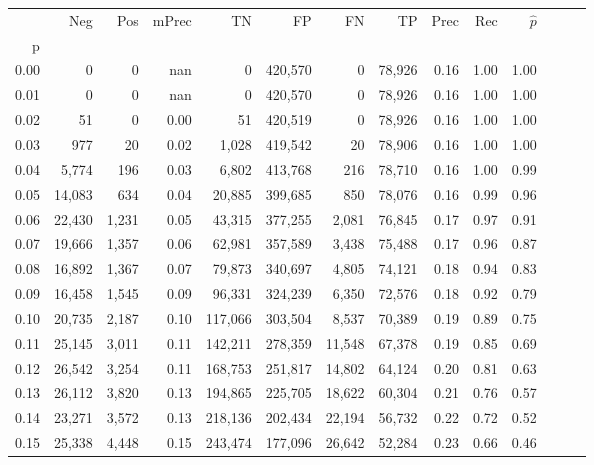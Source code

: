 \begin{tabular}{rrrrrrrrrrrrrr}
\toprule
{} &     Neg &    Pos & mPrec &       TN &       FP &      FN &      TP &  Prec &   Rec & $\hat{p}$ \\
p    &         &        &       &          &          &         &         &       &       &           \\
\midrule
0.00 &       0 &      0 &   nan &        0 &  420,570 &       0 &  78,926 &  0.16 &  1.00 &      1.00 \\
0.01 &       0 &      0 &   nan &        0 &  420,570 &       0 &  78,926 &  0.16 &  1.00 &      1.00 \\
0.02 &      51 &      0 &  0.00 &       51 &  420,519 &       0 &  78,926 &  0.16 &  1.00 &      1.00 \\
0.03 &     977 &     20 &  0.02 &    1,028 &  419,542 &      20 &  78,906 &  0.16 &  1.00 &      1.00 \\
0.04 &   5,774 &    196 &  0.03 &    6,802 &  413,768 &     216 &  78,710 &  0.16 &  1.00 &      0.99 \\
0.05 &  14,083 &    634 &  0.04 &   20,885 &  399,685 &     850 &  78,076 &  0.16 &  0.99 &      0.96 \\
0.06 &  22,430 &  1,231 &  0.05 &   43,315 &  377,255 &   2,081 &  76,845 &  0.17 &  0.97 &      0.91 \\
0.07 &  19,666 &  1,357 &  0.06 &   62,981 &  357,589 &   3,438 &  75,488 &  0.17 &  0.96 &      0.87 \\
0.08 &  16,892 &  1,367 &  0.07 &   79,873 &  340,697 &   4,805 &  74,121 &  0.18 &  0.94 &      0.83 \\
0.09 &  16,458 &  1,545 &  0.09 &   96,331 &  324,239 &   6,350 &  72,576 &  0.18 &  0.92 &      0.79 \\
0.10 &  20,735 &  2,187 &  0.10 &  117,066 &  303,504 &   8,537 &  70,389 &  0.19 &  0.89 &      0.75 \\
0.11 &  25,145 &  3,011 &  0.11 &  142,211 &  278,359 &  11,548 &  67,378 &  0.19 &  0.85 &      0.69 \\
0.12 &  26,542 &  3,254 &  0.11 &  168,753 &  251,817 &  14,802 &  64,124 &  0.20 &  0.81 &      0.63 \\
0.13 &  26,112 &  3,820 &  0.13 &  194,865 &  225,705 &  18,622 &  60,304 &  0.21 &  0.76 &      0.57 \\
0.14 &  23,271 &  3,572 &  0.13 &  218,136 &  202,434 &  22,194 &  56,732 &  0.22 &  0.72 &      0.52 \\
0.15 &  25,338 &  4,448 &  0.15 &  243,474 &  177,096 &  26,642 &  52,284 &  0.23 &  0.66 &      0.46 \\

\end{tabular}
